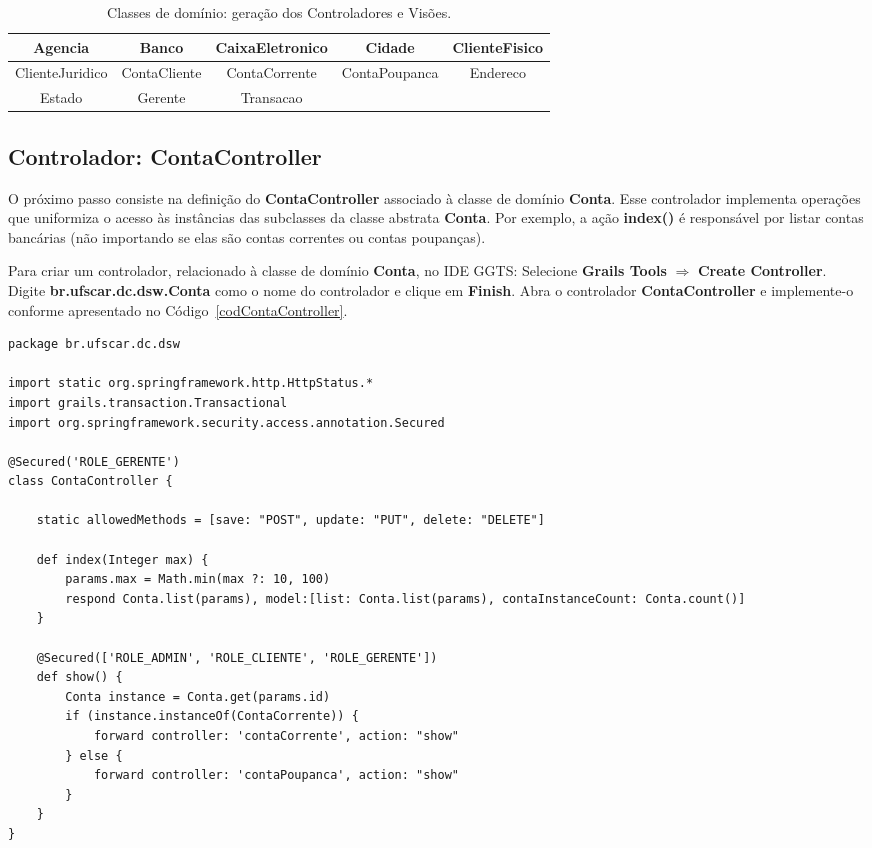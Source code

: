 \begin{table}[htbp]
\centering
\begin{tabular}{|c|c|c|c|c|}
\hline
\rowcolor{Gray}
Agencia & Banco & CaixaEletronico & Cidade & ClienteFisico \\ \hline
\rowcolor{C2}
ClienteJuridico & ContaCliente & ContaCorrente & ContaPoupanca & Endereco \\ \hline
\rowcolor{Gray}
Estado & Gerente &Transacao & &\\ \hline
\end{tabular}
\caption{Classes de domínio: geração dos Controladores e Visões.}
\label{tblGenerateAll}
\end{table}

\subsection{Controlador: ContaController}

\vspace{0.5cm}

O  próximo passo  consiste na  definição  do {\bf  ContaController} associado  à
classe  de  domínio {\bf  Conta}.   Esse  controlador  implementa operações  que
uniformiza o acesso às instâncias das subclasses da classe abstrata {\bf Conta}.
Por exemplo, a ação {\bf index()} é responsável por listar contas bancárias (não
importando se elas são contas correntes ou contas poupanças).

Para criar um  controlador, relacionado à classe de domínio  {\bf Conta}, no IDE
GGTS:   Selecione    {\bf   Grails   Tools}    $\Longrightarrow$   {\bf   Create
  Controller}.  Digite {\bf br.ufscar.dc.dsw.Conta} como o nome do controlador e
clique em {\bf Finish}. Abra  o controlador {\bf ContaController} e implemente-o
conforme apresentado no Código~\ref{codContaController}. 

\begin{lstlisting}[caption=Controlador    {\bf    ContaController},   frame    =
    trBL,float=htbp, label=codContaController] 
package br.ufscar.dc.dsw

import static org.springframework.http.HttpStatus.*
import grails.transaction.Transactional
import org.springframework.security.access.annotation.Secured

@Secured('ROLE_GERENTE')
class ContaController {
    
    static allowedMethods = [save: "POST", update: "PUT", delete: "DELETE"]
    
    def index(Integer max) {
        params.max = Math.min(max ?: 10, 100)
        respond Conta.list(params), model:[list: Conta.list(params), contaInstanceCount: Conta.count()]
    }
    
    @Secured(['ROLE_ADMIN', 'ROLE_CLIENTE', 'ROLE_GERENTE'])
    def show() {
        Conta instance = Conta.get(params.id)
        if (instance.instanceOf(ContaCorrente)) {
            forward controller: 'contaCorrente', action: "show"
        } else {
            forward controller: 'contaPoupanca', action: "show"
        }
    }
}

\end{lstlisting}


